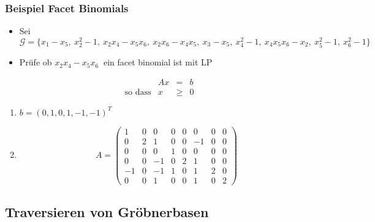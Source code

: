 \documentclass{beamer}
\begin{document}
\begin{frame}
\frametitle{Beispiel Facet Binomials }

\begin{itemize}
\item Sei $\mathcal{G} = \{x_1 - x_5,~x_{2}^{2}-1,~x_{2}x_{4}-x_{5}x_{6},~x_{2}x_{6}-x_{4}x_{5},~x_{3}-x_{5},~x_{4}^{2}-1,~x_{4}x_{5}x_{6}-x_{2},~x_{5}^{2}-1,~x_{6}^{2}-1  \}~$
\item Prüfe ob $x_{2}x_{4}-x_{5}x_{6}~$ ein facet binomial ist mit LP
\end{itemize}

 \[
 	\begin{array}{lrcl}
 	\textrm{ }   & Ax    & =    & b   \\
 	\textrm{so dass}  & x     & \geq & 0
 			    
 	\end{array}
 \]
 
\begin{enumerate}
\item  $b = {\left(0,1,0,1,-1,-1\right)}^{T}$
\item  \[
 A =
 \begin{pmatrix}
 1  & 0 & 0  & 0 & 0 & 0  & 0 & 0\\ 
 0  & 2 & 1  & 0 & 0 & -1 & 0 & 0\\  
 0  & 0 & 0  & 1 & 0 & 0  & 0 & 0\\ 
 0  & 0 & -1 & 0 & 2 & 1  & 0 & 0\\
 -1 & 0 & -1 & 1 & 0 & 1  & 2 & 0\\
 0  & 0 & 1  & 0 & 0 & 1  & 0 & 2
 \end{pmatrix} 
 \] 
\end{enumerate}


\end{frame}

\subsection{Traversieren von Gröbnerbasen}
\end{document}
